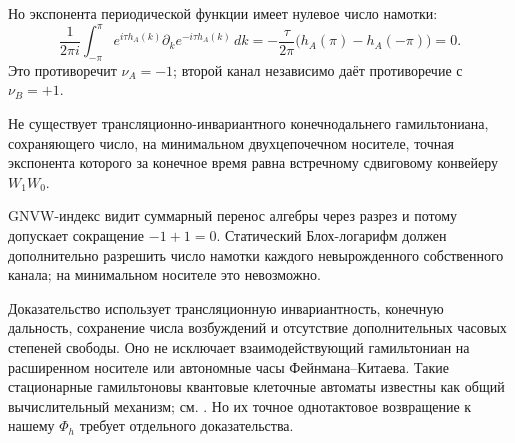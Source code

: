 Но экспонента периодической функции имеет нулевое число намотки:
\begin{equation}
 \frac1{2\pi i}\int_{-\pi}^{\pi}
 e^{i\tau h_A(k)}\partial_k e^{-i\tau h_A(k)}\,dk
 =-\frac{\tau}{2\pi}\bigl(h_A(\pi)-h_A(-\pi)\bigr)=0.
\end{equation}
Это противоречит $\nu_A=-1$; второй канал независимо даёт противоречие
с $\nu_B=+1$.

\begin{theorem}
Не существует трансляционно-инвариантного конечнодальнего гамильтониана,
сохраняющего число, на минимальном двухцепочечном носителе, точная экспонента
которого за конечное время равна встречному сдвиговому конвейеру $W_1W_0$.
\end{theorem}

\begin{remark}
GNVW-индекс видит суммарный перенос алгебры через разрез и потому допускает
сокращение $-1+1=0$. Статический Блох-логарифм должен дополнительно
разрешить число намотки каждого невырожденного собственного канала; на минимальном
носителе это невозможно.
\end{remark}

\begin{nogocriterion}
Доказательство использует трансляционную инвариантность, конечную дальность,
сохранение числа возбуждений и отсутствие дополнительных часовых степеней
свободы. Оно не исключает взаимодействующий гамильтониан на расширенном
носителе или автономные часы Фейнмана--Китаева. Такие стационарные
гамильтоновы квантовые клеточные автоматы известны как общий вычислительный
механизм; см. . Но их точное однотактовое возвращение
к нашему $\Phi_h$ требует отдельного доказательства.
\end{nogocriterion}

